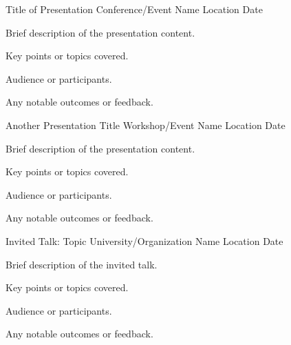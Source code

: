 
\begin{cventries}
    \cventry
    {Title of Presentation} %
    {Conference/Event Name} %
    {Location} %
    {Date} %
    {
      \begin{cvitems} %
        \item {Brief description of the presentation content.}
        \item {Key points or topics covered.}
        \item {Audience or participants.}
        \item {Any notable outcomes or feedback.}
      \end{cvitems}
    }

    \cventry
    {Another Presentation Title} %
    {Workshop/Event Name} %
    {Location} %
    {Date} %
    {
      \begin{cvitems} %
        \item {Brief description of the presentation content.}
        \item {Key points or topics covered.}
        \item {Audience or participants.}
        \item {Any notable outcomes or feedback.}
      \end{cvitems}
    }

    \cventry
    {Invited Talk: Topic} %
    {University/Organization Name} %
    {Location} %
    {Date} %
    {
      \begin{cvitems} %
        \item {Brief description of the invited talk.}
        \item {Key points or topics covered.}
        \item {Audience or participants.}
        \item {Any notable outcomes or feedback.}
      \end{cvitems}
    }
\end{cventries}
